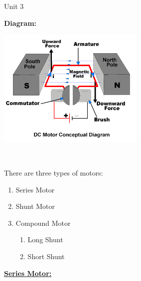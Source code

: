 \documentclass[11pt]{beamer}
\begin{document}
\begin{frame}[t,allowframebreaks]{Unit 3}
        \framebreak

        \textbf{Diagram:}

        \begin{center}
            \includegraphics[width=200pt]{dc-motor-construction}
        \end{center}

        \framebreak

        \begin{center}
            \underline{}\\[10pt]%
        \end{center}

        There are three types of motors:

        \begin{enumerate}
            \item Series Motor
            \item Shunt Motor
            \item Compound Motor
            \begin{enumerate}
                \item Long Shunt
                \item Short Shunt
            \end{enumerate}
        \end{enumerate}

        \framebreak

        \underline{\textbf{Series Motor:}}\\[10pt]%


\end{frame}
\end{document}

